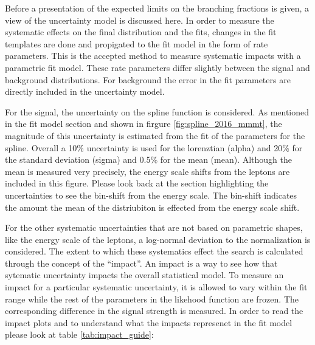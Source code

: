 Before a presentation of the expected limits on the branching fractions is given, a view of the uncertainty model is discussed here. 
In order to measure the systematic effects on the final distribution and the fits, changes in the fit templates are done and propigated to the fit model in the form of rate parameters. This is the accepted method to measure systematic impacts with a parametric fit model. These rate parameters differ slightly between the signal and background distributions. 
For background the error in the fit parameters are directly included in the uncertainty model. 

For the signal, the uncertainty on the spline function is considered. As mentioned in the fit model section and shown in firgure \ref{fig:spline_2016_mmmt}, the magnitude of this uncertainty is estimated from the fit of the parameters for the spline. Overall a 10\% uncertainty is used for the lorenztian (alpha) and 20\% for the standard deviation (sigma) and 0.5\% for the mean (mean). Although the mean is measured very precisely, the energy scale shifts from the leptons are included in this figure. Please look back at the section highlighting the uncertainties to see the bin-shift from the energy scale. The bin-shift indicates the amount the mean of the distriubiton is effected from the energy scale shift.  


For the other systematic uncertainties that are not based on parametric shapes, like the energy scale of the leptons, a log-normal deviation to the normalization is considered. 
The extent to which these systematics effect the search is calculated through the concept of the ``impact''. An impact is a way to see how that sytematic uncertainty impacts the overall statistical model. To measure an impact for a particular systematic uncertainty, it is allowed to vary within the fit range while the rest of the parameters in the likehood function are frozen. The corresponding difference in the signal strength is measured. 
In order to read the impact plots and to understand what the impacts represenet in the fit model please look at table \ref{tab:impact_guide}:

